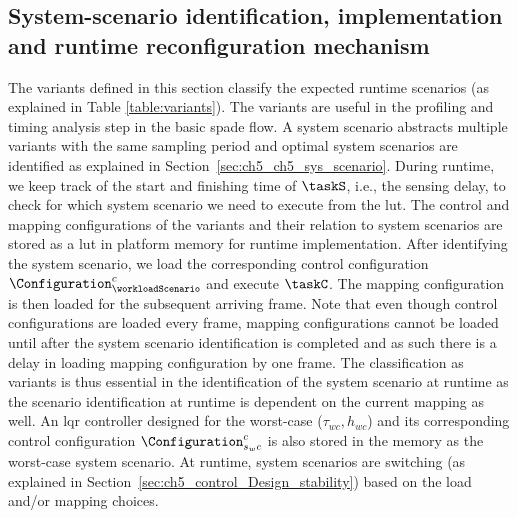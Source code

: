\subsection{System-scenario identification, implementation and runtime reconfiguration mechanism}
\label{sec:ch5_runtime_nvidia}
The variants defined in this section classify the expected runtime scenarios (as explained in Table \ref{table:variants}). The variants are useful in the profiling and timing analysis step in the basic \gls{spade} flow. 
A system scenario abstracts multiple variants with the same sampling period and optimal system scenarios are identified as explained in Section~\ref{sec:ch5_ch5_sys_scenario}. 
During runtime, we keep track of the start and finishing time of $\taskS$, i.e., the sensing delay, to check for which system scenario we need to execute from the \gls{lut}.
The control and mapping configurations of the variants and their relation to system scenarios are stored as a \gls{lut} in platform memory for runtime implementation. 
After identifying the system scenario, we load the corresponding control configuration $\Configuration_{\workloadScenario}^c$ and execute $\taskC$.
The mapping configuration is then loaded for the subsequent arriving frame. 
Note that even though control configurations are loaded every frame, mapping configurations cannot be loaded until after the system scenario identification is completed and as such there is a delay in loading mapping configuration by one frame.
The classification as variants is thus essential in the identification of the system scenario at runtime 
as the scenario identification at runtime is dependent on the current mapping as well. 
An \gls{lqr} controller designed for the worst-case ($\tau_{wc},h_{wc}$) and its corresponding control configuration $\Configuration_{s_wc}^c$ is also stored in the memory as the worst-case system scenario.
At runtime, system scenarios are switching (as explained in Section~\ref{sec:ch5_control_Design_stability}) based on the load and/or mapping choices.